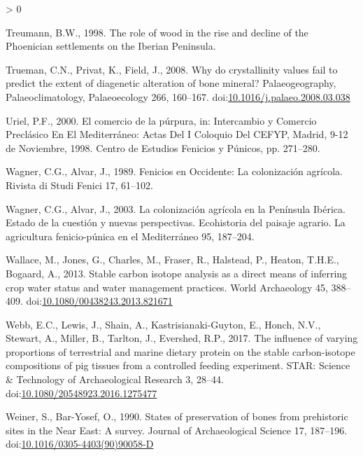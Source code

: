\documentclass[5p]{elsarticle} %
\newlength{\cslhangindent}
\newenvironment{CSLReferences}[2] %
 {%
  \setlength{\parindent}{0pt}
  \ifodd #1 \everypar{\setlength{\hangindent}{\cslhangindent}}\ignorespaces\fi
  \ifnum #2 > 0
  \setlength{\parskip}{#2\baselineskip}
  \fi
 }%
 {}
\begin{document}
\begin{CSLReferences}{1}{0}
\leavevmode\hypertarget{ref-treumann98}{}%
Treumann, B.W., 1998. The role of wood in the rise and decline of the {Phoenician} settlements on the {Iberian Peninsula}.

\leavevmode\hypertarget{ref-trueman_etal08}{}%
Trueman, C.N., Privat, K., Field, J., 2008. Why do crystallinity values fail to predict the extent of diagenetic alteration of bone mineral? Palaeogeography, Palaeoclimatology, Palaeoecology 266, 160--167. doi:\href{https://doi.org/10.1016/j.palaeo.2008.03.038}{10.1016/j.palaeo.2008.03.038}

\leavevmode\hypertarget{ref-uriel00}{}%
Uriel, P.F., 2000. El comercio de la púrpura, in: Intercambio y Comercio Preclásico En El {Mediterráneo}: Actas Del {I} Coloquio Del {CEFYP}, {Madrid}, 9-12 de Noviembre, 1998. {Centro de Estudios Fenicios y Púnicos}, pp. 271--280.

\leavevmode\hypertarget{ref-wagner_alvar89}{}%
Wagner, C.G., Alvar, J., 1989. Fenicios en {Occidente}: La colonización agrícola. Rivista di Studi Fenici 17, 61--102.

\leavevmode\hypertarget{ref-wagner_alvar03}{}%
Wagner, C.G., Alvar, J., 2003. La colonización agrícola en la {Península Ibérica}. {Estado} de la cuestión y nuevas perspectivas. Ecohistoria del paisaje agrario. La agricultura fenicio-púnica en el Mediterráneo 95, 187--204.

\leavevmode\hypertarget{ref-wallace_etal13}{}%
Wallace, M., Jones, G., Charles, M., Fraser, R., Halstead, P., Heaton, T.H.E., Bogaard, A., 2013. Stable carbon isotope analysis as a direct means of inferring crop water status and water management practices. World Archaeology 45, 388--409. doi:\href{https://doi.org/10.1080/00438243.2013.821671}{10.1080/00438243.2013.821671}

\leavevmode\hypertarget{ref-webb_etal17a}{}%
Webb, E.C., Lewis, J., Shain, A., Kastrisianaki-Guyton, E., Honch, N.V., Stewart, A., Miller, B., Tarlton, J., Evershed, R.P., 2017. The influence of varying proportions of terrestrial and marine dietary protein on the stable carbon-isotope compositions of pig tissues from a controlled feeding experiment. STAR: Science \& Technology of Archaeological Research 3, 28--44. doi:\href{https://doi.org/10.1080/20548923.2016.1275477}{10.1080/20548923.2016.1275477}

\leavevmode\hypertarget{ref-weiner_bar-yosef90}{}%
Weiner, S., Bar-Yosef, O., 1990. States of preservation of bones from prehistoric sites in the {Near East}: {A} survey. Journal of Archaeological Science 17, 187--196. doi:\href{https://doi.org/10.1016/0305-4403(90)90058-D}{10.1016/0305-4403(90)90058-D}


\end{CSLReferences}
\end{document}
